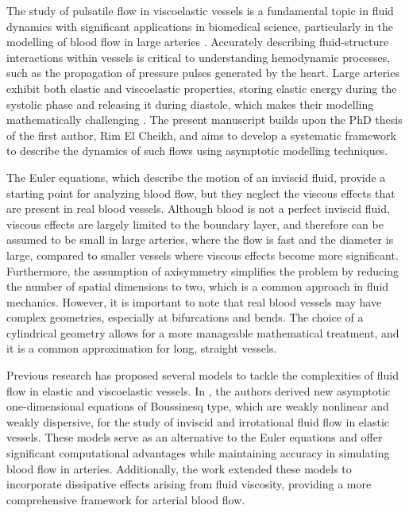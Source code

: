 \documentclass[alpha-refs, 12pt]{wiley-article}
\begin{document}
The study of pulsatile flow in viscoelastic vessels is a fundamental topic in fluid dynamics with significant applications in biomedical science, particularly in the modelling of blood flow in large arteries \citep{Fung1997a}. Accurately describing fluid-structure interactions within vessels is critical to understanding hemodynamic processes, such as the propagation of pressure pulses generated by the heart. Large arteries exhibit both elastic and viscoelastic properties, storing elastic energy during the systolic phase and releasing it during diastole, which makes their modelling mathematically challenging \citep{Chandran2012, Quarteroni2004, VandeVosse2011}. The present manuscript builds upon the PhD thesis of the first author, Rim El Cheikh, and aims to develop a systematic framework to describe the dynamics of such flows using asymptotic modelling techniques.

The Euler equations, which describe the motion of an inviscid fluid, provide a starting point for analyzing blood flow, but they neglect the viscous effects that are present in real blood vessels. Although blood is not a perfect inviscid fluid, viscous effects are largely limited to the boundary layer, and therefore can be assumed to be small in large arteries, where the flow is fast and the diameter is large, compared to smaller vessels where viscous effects become more significant. Furthermore, the assumption of axisymmetry simplifies the problem by reducing the number of spatial dimensions to two, which is a common approach in fluid mechanics. However, it is important to note that real blood vessels may have complex geometries, especially at bifurcations and bends. The choice of a cylindrical geometry allows for a more manageable mathematical treatment, and it is a common approximation for long, straight vessels.

Previous research has proposed several models to tackle the complexities of fluid flow in elastic and viscoelastic vessels. In \cite{Mitsotakis2018}, the authors derived new asymptotic one-dimensional equations of Boussinesq type, which are weakly nonlinear and weakly dispersive, for the study of inviscid and irrotational fluid flow in elastic vessels. These models serve as an alternative to the Euler equations and offer significant computational advantages while maintaining accuracy in simulating blood flow in arteries. Additionally, the work extended these models to incorporate dissipative effects arising from fluid viscosity, providing a more comprehensive framework for arterial blood flow.
\end{document}
